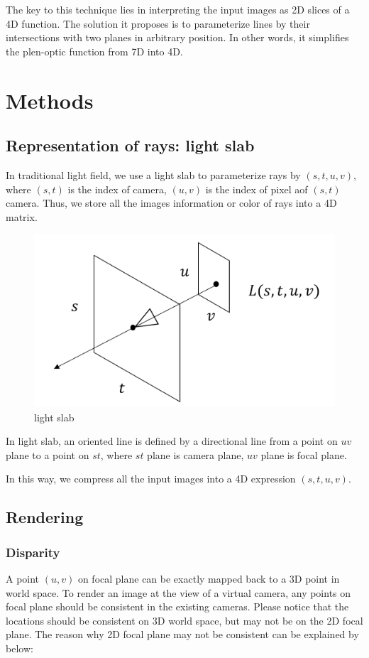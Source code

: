\documentclass[acmtog]{acmart}
\begin{document}
\quad The key to this technique lies in interpreting the input images as 2D slices of a 4D function. The solution it proposes is to parameterize lines by their intersections with two planes in arbitrary position. In other words, it simplifies the plen-optic function from 7D into 4D.

\section{Methods}

\subsection{Representation of rays: light slab}
	\quad In traditional light field, we use a light slab to parameterize rays by $(s, t, u, v)$, where $(s, t)$ is the index of camera, $(u, v)$ is the index of pixel aof $(s,t)$ camera. Thus, we store all the images information or color of rays into a 4D matrix.

\begin{figure}[h]
	\centering
	\includegraphics[scale=0.14]{light slab.png}
	\caption{light slab}
	\label{fig:Fig1}
\end{figure}

 \quad In light slab, an oriented line is defined by a directional line from a point on $uv$ plane to a point on $st$, where $st$ plane is camera plane, $uv$ plane is focal plane.
 
 \quad In this way, we compress all the input images into a 4D expression $(s, t, u, v)$.
 
 \subsection{Rendering}
 \subsubsection{Disparity}
 	\quad A point $(u,v)$ on focal plane can be exactly mapped back to a 3D point in world space. To render an image at the view of a virtual camera, any points on focal plane should be consistent in the existing cameras. Please notice that the locations should be consistent on 3D world space, but may not be on the 2D focal plane. The reason why 2D focal plane may not be consistent can be explained by below:
 	
\end{document}
